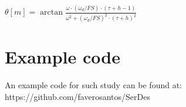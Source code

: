 \documentclass{article}
\begin{document}
\begin{question}
	\centerline{$ \theta[m] = \arctan{\frac{\omega \cdot (\omega_d / FS) \cdot (\tau + h - 1)}{\omega^2 + (\omega_d / FS)^2 \cdot (\tau + h)^2}}
	$}
\end{question}

\section{Example code}

An example code for such study can be found at: https://github.com/faverosantos/SerDes


\begin{thebibliography}{9}
	
	
	
\end{thebibliography}
\end{document}
